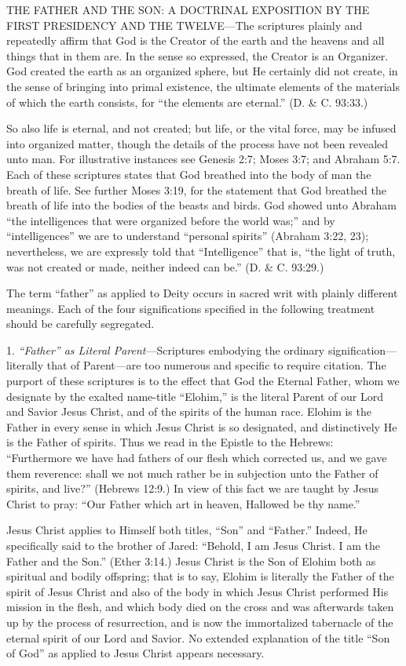 THE FATHER AND THE SON: A DOCTRINAL EXPOSITION BY THE FIRST
PRESIDENCY AND THE TWELVE—The scriptures plainly and repeatedly affirm that God
is the Creator of the earth and the heavens and all things that in them are. In the sense so
expressed, the Creator is an Organizer. God created the earth as an organized sphere, but He
certainly did not create, in the sense of bringing into primal existence, the ultimate elements
of the materials of which the earth consists, for ``the elements are eternal.'' (D. \& C. 93:33.)

So also life is eternal, and not created; but life, or the vital force, may be infused into
organized matter, though the details of the process have not been revealed unto man. For
illustrative instances see Genesis 2:7; Moses 3:7; and Abraham 5:7. Each of these scriptures
states that God breathed into the body of man the breath of life. See further Moses 3:19, for
the statement that God breathed the breath of life into the bodies of the beasts and birds. God
showed unto Abraham ``the intelligences that were organized before the world was;'' and by
``intelligences'' we are to understand ``personal spirits'' (Abraham 3:22, 23); nevertheless, we
are expressly told that ``Intelligence'' that is, ``the light of truth, was not created or made,
neither indeed can be.'' (D. \& C. 93:29.)

The term ``father'' as applied to Deity occurs in sacred writ with plainly different meanings.
Each of the four significations specified in the following treatment should be carefully
segregated.

1. \textit{``Father'' as Literal Parent}—Scriptures embodying the ordinary signification—literally
that of Parent—are too numerous and specific to require citation. The purport of these
scriptures is to the effect that God the Eternal Father, whom we designate by the exalted
name-title ``Elohim,'' is the literal Parent of our Lord and Savior Jesus Christ, and of the
spirits of the human race. Elohim is the Father in every sense in which Jesus Christ is so
designated, and distinctively He is the Father of spirits. Thus we read in the Epistle to the
Hebrews: ``Furthermore we have had fathers of our flesh which corrected us, and we gave
them reverence: shall we not much rather be in subjection unto the Father of spirits, and
live?'' (Hebrews 12:9.) In view of this fact we are taught by Jesus Christ to pray: ``Our Father
which art in heaven, Hallowed be thy name.''

Jesus Christ applies to Himself both titles, ``Son'' and ``Father.'' Indeed, He specifically said to
the brother of Jared: ``Behold, I am Jesus Christ. I am the Father and the Son.'' (Ether 3:14.)
Jesus Christ is the Son of Elohim both as spiritual and bodily offspring; that is to say, Elohim
is literally the Father of the spirit of Jesus Christ and also of the body in which Jesus Christ
performed His mission in the flesh, and which body died on the cross and was afterwards
taken up by the process of resurrection, and is now the immortalized tabernacle of the eternal
spirit of our Lord and Savior. No extended explanation of the title ``Son of God'' as applied to
Jesus Christ appears necessary.

